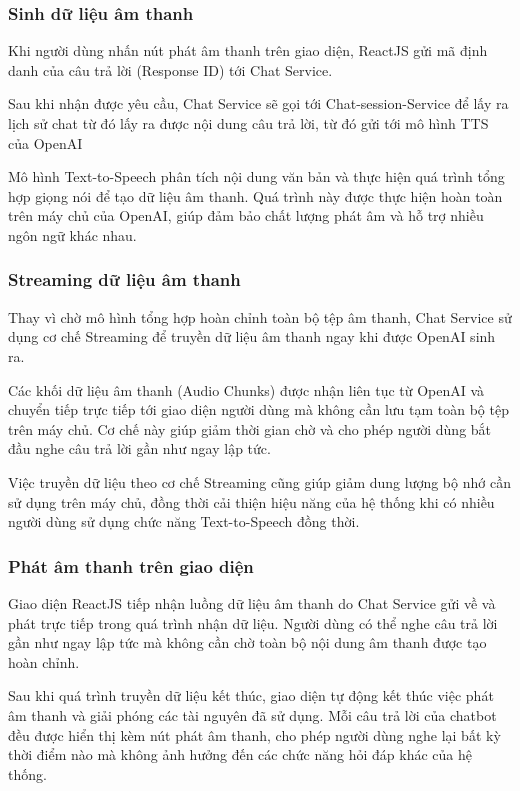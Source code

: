 \documentclass[../DoAn.tex]{subfiles}
\begin{document}
\subsubsection{Sinh dữ liệu âm thanh}
Khi người dùng nhấn nút phát âm thanh trên giao diện, ReactJS gửi mã định danh của câu trả lời (Response ID) tới Chat Service.

Sau khi nhận được yêu cầu, Chat Service sẽ gọi tới Chat-session-Service để lấy ra lịch sử chat từ đó lấy ra được nội dung câu trả lời, từ đó gửi tới mô hình TTS của OpenAI

Mô hình Text-to-Speech phân tích nội dung văn bản và thực hiện quá trình tổng hợp giọng nói để tạo dữ liệu âm thanh. Quá trình này được thực hiện hoàn toàn trên máy chủ của OpenAI, giúp đảm bảo chất lượng phát âm và hỗ trợ nhiều ngôn ngữ khác nhau.

\subsubsection{Streaming dữ liệu âm thanh}
Thay vì chờ mô hình tổng hợp hoàn chỉnh toàn bộ tệp âm thanh, Chat Service sử dụng cơ chế Streaming để truyền dữ liệu âm thanh ngay khi được OpenAI sinh ra.

Các khối dữ liệu âm thanh (Audio Chunks) được nhận liên tục từ OpenAI và chuyển tiếp trực tiếp tới giao diện người dùng mà không cần lưu tạm toàn bộ tệp trên máy chủ. Cơ chế này giúp giảm thời gian chờ và cho phép người dùng bắt đầu nghe câu trả lời gần như ngay lập tức.

Việc truyền dữ liệu theo cơ chế Streaming cũng giúp giảm dung lượng bộ nhớ cần sử dụng trên máy chủ, đồng thời cải thiện hiệu năng của hệ thống khi có nhiều người dùng sử dụng chức năng Text-to-Speech đồng thời.

\subsubsection{Phát âm thanh trên giao diện}
Giao diện ReactJS tiếp nhận luồng dữ liệu âm thanh do Chat Service gửi về và phát trực tiếp trong quá trình nhận dữ liệu. Người dùng có thể nghe câu trả lời gần như ngay lập tức mà không cần chờ toàn bộ nội dung âm thanh được tạo hoàn chỉnh.

Sau khi quá trình truyền dữ liệu kết thúc, giao diện tự động kết thúc việc phát âm thanh và giải phóng các tài nguyên đã sử dụng. Mỗi câu trả lời của chatbot đều được hiển thị kèm nút phát âm thanh, cho phép người dùng nghe lại bất kỳ thời điểm nào mà không ảnh hưởng đến các chức năng hỏi đáp khác của hệ thống.
\end{document}
